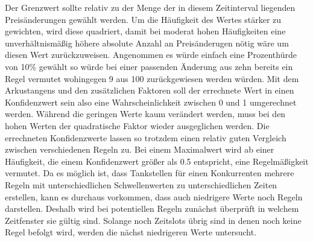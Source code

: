 \documentclass[12pt,a4paper,bibliography=totocnumbered,listof=totocnumbered]{scrartcl}
\begin{document}
Der Grenzwert sollte relativ zu der Menge der in diesem Zeitinterval liegenden Preisänderungen gewählt werden. Um die Häufigkeit des Wertes stärker zu gewichten, wird diese quadriert, damit bei moderat hohen Häufigkeiten eine unverhältnismäßig höhere absolute Anzahl an Preisänderugen nötig wäre um diesen Wert zurückzuweisen. Angenommen es würde einfach eine Prozenthürde von 10\% gewählt so würde bei einer passenden Änderung aus zehn bereits ein Regel vermutet wohingegen 9 aus 100 zurückgewiesen werden würden. Mit dem Arkustangens und den zusätzlichen Faktoren soll der errechnete Wert in einen Konfidenzwert sein also eine Wahrscheinlichkeit zwischen 0 und 1 umgerechnet werden. Während die geringen Werte kaum verändert werden, muss bei den hohen Werten der quadratische Faktor wieder ausgeglichen werden. Die errechneten Konfidenzwerte lassen so trotzdem einen relativ guten Vergleich zwischen verschiedenen Regeln zu. Bei einem Maximalwert wird ab einer Häufigkeit, die einem Konfidenzwert größer als 0.5 entspricht, eine Regelmäßigkeit vermutet. Da es möglich ist, dass Tankstellen für einen Konkurrenten mehrere Regeln mit unterschiedlichen Schwellenwerten zu unterschiedlichen Zeiten erstellen, kann es durchaus vorkommen, dass auch niedrigere Werte noch Regeln darstellen. Deshalb wird bei potentiellen Regeln zunächst überprüft in welchem Zeitfenster sie gültig sind. Solange noch Zeitslots übrig sind in denen noch keine Regel befolgt wird, werden die nächst niedrigeren  Werte untersucht. 

\end{document}
